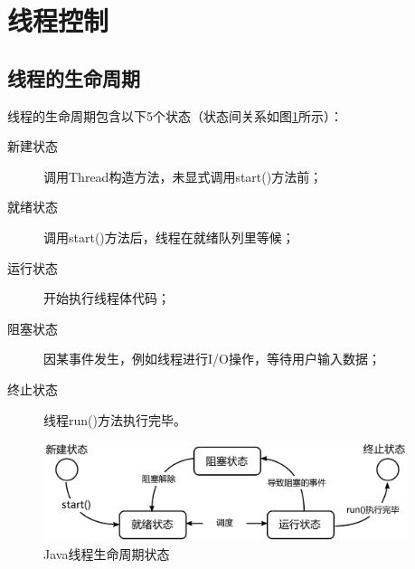 
\section{线程控制}

\subsection{线程的生命周期}

线程的生命周期包含以下5个状态（状态间关系如图\ref{fig:thread-lifecycle}所示）：

\begin{description}
\item[新建状态] 调用Thread构造方法，未显式调用start()方法前；
\item[就绪状态] 调用start()方法后，线程在就绪队列里等候；
\item[运行状态] 开始执行线程体代码；
\item[阻塞状态] 因某事件发生，例如线程进行I/O操作，等待用户输入数据；
\item[终止状态] 线程run()方法执行完毕。
\end{description}


\begin{figure}[htb]
\centering
\includegraphics[width=0.95\textwidth]{images/Java-thread-programming/fig-thread-lifecycle.pdf}
\caption{Java线程生命周期状态}
\label{fig:thread-lifecycle}
\end{figure}

